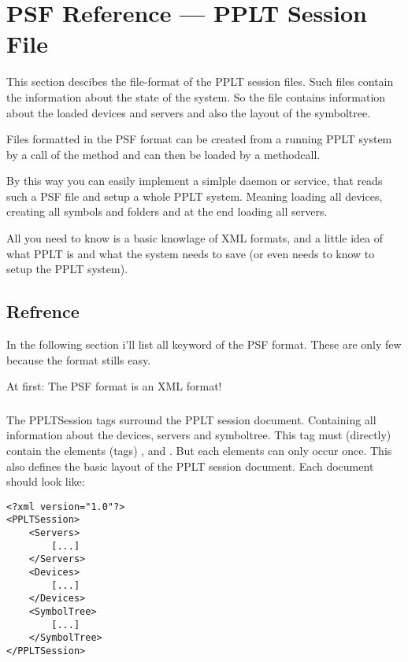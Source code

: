 \newcommand{\PSFTag}[1]{\index{PSF Elements!#1}}



\chapter{PSF Reference --- \textbf{P}PLT \textbf{S}ession \textbf{F}ile}

This section descibes the file-format of the PPLT session files. Such 
files contain the information about the state of the system. 
So the file contains information about the loaded devices and servers and
also the layout of the symboltree.

Files formatted in the PSF format can be created from a running PPLT system by 
a call of the method  and can then be loaded by a 
 methodcall.

By this way you can easily implement a simlple daemon or service, that reads 
such a PSF file and setup a whole PPLT system. Meaning loading all devices, 
creating all symbols and folders and at the end loading all servers.

All you need to know is a basic knowlage of XML formats, and a little idea of 
what PPLT is and what the system needs to save (or even needs to know to setup
the PPLT system). 

\section{Refrence}
In the following section i'll list all keyword of the PSF format. These are only few
because the format stills easy. 

At first: The PSF format is an XML format!

\subsection{}
\PSFTag{PPLTSession}
The PPLTSession tags surround the PPLT session document. Containing all 
information about the devices, servers and symboltree. This tag must
(directly) contain the elements (tags) , 
and . But each elements can only occur once.
This also defines the basic layout of the PPLT session document. Each document
should look like:
\begin{verbatim}
<?xml version="1.0"?>
<PPLTSession>
    <Servers>
        [...]
    </Servers>
    <Devices>
        [...]
    </Devices>
    <SymbolTree>
        [...]
    </SymbolTree>
</PPLTSession>
\end{verbatim}


